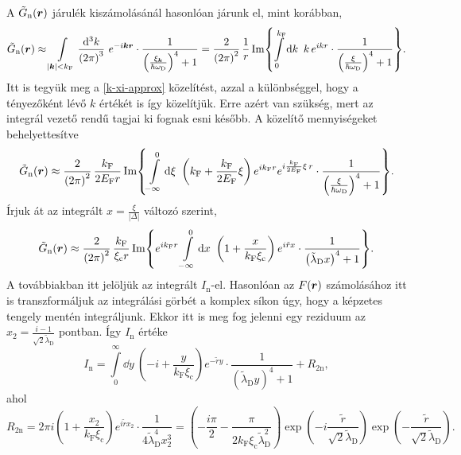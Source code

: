 \documentclass[a4paper,12pt,titlepage]{article}
\newcommand{\KK}{{\vb*{k}}}
\newcommand{\RR}{{\vb*{r}}}
\newcommand{\kF}{{k_\text{F}}}
\newcommand{\EF}{{E_\text{F}}}
\begin{document}
A $\tilde{G}_\text{n}(\RR)$ járulék kiszámolásánál hasonlóan járunk el, mint korábban,
\begin{equation}
	\tilde{G}_\text{n}(\RR) \approx \int\limits_{\left| \KK \right| < \kF} \frac{\dd[3]{k}}{\left( 2 \pi \right)^3} ~ e^{-i \KK \RR} \cdot \frac{1}{\left( \frac{\xi_\KK}{\hbar \omega_\text{D}} \right)^4 + 1} = \frac{2}{\left( 2 \pi \right)^2} \, \frac{1}{r} \Im{ \int\limits_0^{\kF} \dd{k} ~ k \, e^{i k r} \cdot \frac{1}{\left( \frac{\xi}{\hbar \omega_\text{D}} \right)^4 + 1} }.
\end{equation}
Itt is tegyük meg a \eqref{k-xi-approx} közelítést, azzal a különbséggel, hogy a tényezőként lévő $k$ értékét is így közelítjük.  Erre azért van szükség, mert az integrál vezető rendű tagjai ki fognak esni később.  A közelítő mennyiségeket behelyettesítve
\begin{equation}
	\tilde{G}_\text{n}(\RR) \approx \frac{2}{\left( 2 \pi \right)^2} \, \frac{\kF}{2 \EF r} \Im{ \int\limits_{-\infty}^0 \dd{\xi} ~ \left( \kF + \frac{\kF}{2 \EF} \xi \right) e^{i \kF r} e^{i \frac{\kF}{2 \EF} \xi \, r} \cdot \frac{1}{\left( \frac{\xi}{\hbar \omega_\text{D}} \right)^4 + 1} }.
\end{equation}
Írjuk át az integrált $x = \frac{\xi}{\left| \Delta \right|}$ változó szerint,
\begin{equation}
	\tilde{G}_\text{n}(\RR) \approx \frac{2}{\left( 2 \pi \right)^2} \, \frac{\kF}{\xi_\text{c} r} \Im{ e^{i \kF r} \int\limits_{-\infty}^0 \dd{x} ~ \left( 1 + \frac{x}{\kF \xi_\text{c}} \right) e^{i \tilde{r} x} \cdot \frac{1}{\left( \tilde{\lambda}_\text{D} x \right)^4 + 1} }.
\end{equation}
A továbbiakban itt jelöljük az integrált $I_\text{n}$-el.  Hasonlóan az $F(\RR)$ számolásához itt is transzformáljuk az integrálási görbét a komplex síkon úgy, hogy a képzetes tengely mentén integráljunk.  Ekkor itt is meg fog jelenni egy reziduum az $x_2 = \frac{i - 1}{\sqrt{2} \tilde{\lambda}_\text{D}}$ pontban.  Így $I_\text{n}$ értéke
\begin{equation}
	I_\text{n} = \int\limits_0^\infty \dd{y} ~ \left( -i + \frac{y}{\kF \xi_\text{c}} \right) e^{-\tilde{r} y} \cdot \frac{1}{\left( \tilde{\lambda}_\text{D} y \right)^4 + 1} + R_{2 \text{n}},
\end{equation}
ahol
\begin{equation}
	R_{2 \text{n}} = 2 \pi i \left( 1 + \frac{x_2}{\kF \xi_\text{c}} \right) e^{i \tilde{r} x_2} \cdot \frac{1}{4 \tilde{\lambda}_\text{D}^4 x_2^3} = \left( -\frac{i \pi}{2} - \frac{\pi}{2 \kF \xi_\text{c} \tilde{\lambda}_\text{D}^2} \right) \exp(-i \frac{\tilde{r}}{\sqrt{2} \tilde{\lambda}_\text{D}}) \exp(-\frac{\tilde{r}}{\sqrt{2} \tilde{\lambda}_\text{D}}).
\end{equation}
\end{document}
